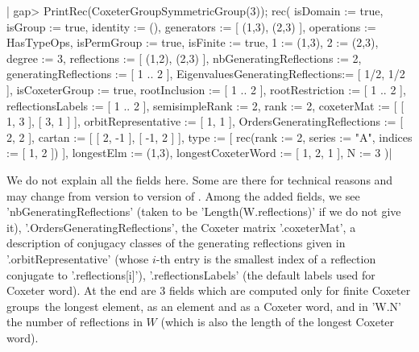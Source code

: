 |    gap> PrintRec(CoxeterGroupSymmetricGroup(3));
    rec(
      isDomain                        := true,
      isGroup                         := true,
      identity                        := (),
      generators                      := [ (1,3), (2,3) ],
      operations                      := HasTypeOps,
      isPermGroup                     := true,
      isFinite                        := true,
      1                               := (1,3),
      2                               := (2,3),
      degree                          := 3,
      reflections                     := [ (1,2), (2,3) ],
      nbGeneratingReflections         := 2,
      generatingReflections           := [ 1 .. 2 ],
      EigenvaluesGeneratingReflections:= [ 1/2, 1/2 ],
      isCoxeterGroup                  := true,
      rootInclusion                   := [ 1 .. 2 ],
      rootRestriction                 := [ 1 .. 2 ],
      reflectionsLabels               := [ 1 .. 2 ],
      semisimpleRank                  := 2,
      rank                            := 2,
      coxeterMat                      := [ [ 1, 3 ], [ 3, 1 ] ],
      orbitRepresentative             := [ 1, 1 ],
      OrdersGeneratingReflections     := [ 2, 2 ],
      cartan                          := [ [ 2, -1 ], [ -1, 2 ] ],
      type                            := [ rec(rank    := 2,
          series  := "A",
          indices := [ 1, 2 ]) ],
      longestElm                      := (1,3),
      longestCoxeterWord              := [ 1, 2, 1 ],
      N                               := 3 )|

We do not explain all the fields here. Some are there for technical reasons
and  may change from version to version of \CHEVIE. Among the added fields,
we see 'nbGeneratingReflections' (taken to be 'Length(W.reflections)' if we
do   not  give  it),  '.OrdersGeneratingReflections',  the  Coxeter  matrix
'.coxeterMat',  a  description  of  conjugacy  classes  of  the  generating
reflections  given  in  '.orbitRepresentative'  (whose  $i$-th entry is the
smallest   index   of   a   reflection   conjugate  to  '.reflections[i]'),
'.reflectionsLabels' (the default labels used for Coxeter word). At the end
are  3  fields  which  are  computed  only for finite Coxeter groups\:\ the
longest  element, as  an element  and as  a Coxeter  word, and in 'W.N' the
number  of reflections  in $W$  (which is  also the  length of  the longest
Coxeter word).


